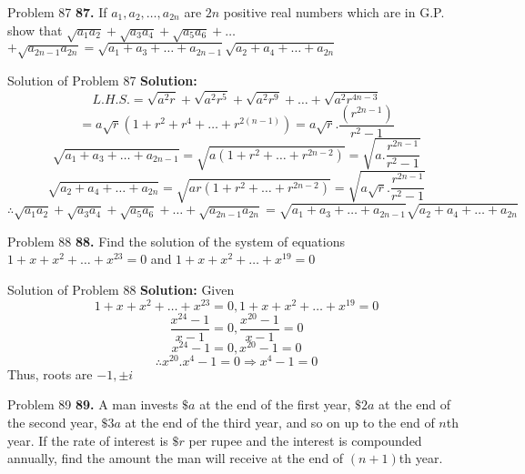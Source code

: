 \documentclass[aspectratio=1610,8pt]{beamer}
\begin{document}
\begin{frame}{Problem 87}
  \textbf{87.} If $a_1, a_2, \ldots, a_{2n}$ are $2n$ positive real numbers which are in G.P. show that $\sqrt{a_1a_2} +
  \sqrt{a_3a_4} + \sqrt{a_5a_6} + \ldots$ $ + \sqrt{a_{2n - 1}a_{2n}} = \sqrt{a_1 + a_3 + \ldots + a_{2n - 1}}\sqrt{a_2 + a_4 +
    \ldots + a_{2n}}$
\end{frame}
\begin{frame}{Solution of Problem 87}
  \textbf{Solution:} $$L.H.S. = \sqrt{a^2r} + \sqrt{a^2r^5} + \sqrt{a^2r^9} + \ldots + \sqrt{a^2r^{4n - 3}}$$
  $$= a\sqrt{r}(1 + r^2 + r^4 + \ldots + r^{2(n - 1)}) = a\sqrt{r}.\frac{(r^{2n - 1})}{r^2 - 1}$$
  $$\sqrt{a_1 + a_3 + \ldots + a_{2n - 1}} = \sqrt{a(1 + r^2 + \ldots + r^{2n - 2})} = \sqrt{a.\frac{r^{2n - 1}}{r^2 - 1}}$$
  $$\sqrt{a_2 + a_4 + \ldots + a_{2n}} = \sqrt{ar(1 + r^2 + \ldots + r^{2n - 2})} = \sqrt{a\sqrt{r}.\frac{r^{2n - 1}}{r^2 - 1}}$$
  $$\therefore \sqrt{a_1a_2} + \sqrt{a_3a_4} + \sqrt{a_5a_6} + \ldots + \sqrt{a_{2n - 1}a_{2n}} = \sqrt{a_1 + a_3 + \ldots +
    a_{2n - 1}}\sqrt{a_2 + a_4 + \ldots + a_{2n}}$$
\end{frame}
\begin{frame}{Problem 88}
  \textbf{88.} Find the solution of the system of equations $1 + x + x^2 + \ldots + x^{23} = 0$ and $1 + x + x^2 + \ldots + x^{19}
  = 0$
\end{frame}
\begin{frame}{Solution of Problem 88}
  \textbf{Solution:} Given $$1 + x + x^2 + \ldots + x^{23} = 0, 1 + x + x^2 + \ldots + x^{19} = 0$$
  $$\frac{x^{24} - 1}{x - 1} = 0, \frac{x^{20} - 1}{x - 1} = 0$$
  $$x^{24} - 1 = 0, x^{20} - 1 = 0$$
  $$\therefore x^{20}.x^4 - 1 = 0 \Rightarrow x^4 - 1 = 0$$
  Thus, roots are $-1, \pm i$
\end{frame}
\begin{frame}{Problem 89}
  \textbf{89.} A man invests $\$a$ at the end of the first year, $\$2a$ at the end of the second year, $\$3a$ at the end of the
  third year, and so on up to the end of $n$th year. If the rate of interest is $\$r$ per rupee and the interest is compounded
  annually, find the amount the man will receive at the end of $(n + 1)$th year.
\end{frame}
\end{document}
